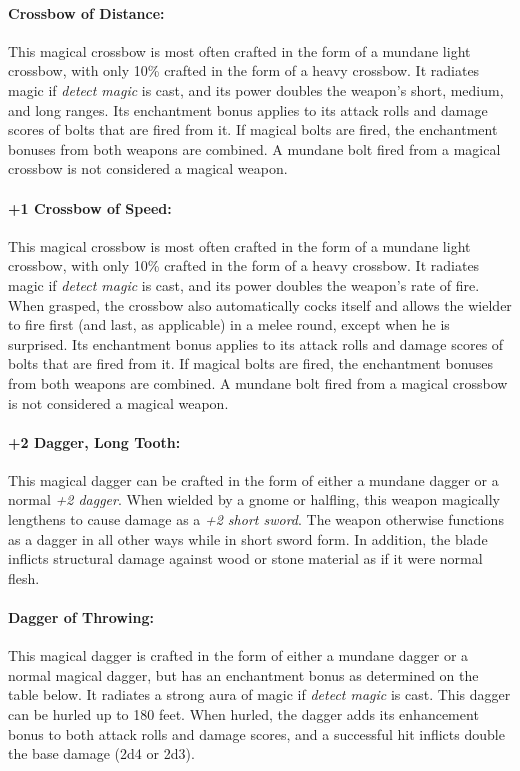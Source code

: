 \begin{multicols}{2}
\paragraph{Crossbow of Distance:} This magical crossbow is most often crafted in the form of a mundane light crossbow, with only 10\% crafted in the form of a heavy crossbow.  It radiates magic if \textit{detect magic} is cast, and its power doubles the weapon's short, medium, and long ranges.  Its enchantment bonus applies to its attack rolls and damage scores of bolts that are fired from it.  If magical bolts are fired, the enchantment bonuses from both weapons are combined.  A mundane bolt fired from a magical crossbow is not considered a magical weapon.

\paragraph{+1 Crossbow of Speed:} This magical crossbow is most often crafted in the form of a mundane light crossbow, with only 10\% crafted in the form of a heavy crossbow.  It radiates magic if \textit{detect magic} is cast, and its power doubles the weapon's rate of fire.    When grasped, the crossbow also automatically cocks itself and allows the wielder to fire first (and last, as applicable) in a melee round, except when he is surprised.  Its enchantment bonus applies to its attack rolls and damage scores of bolts that are fired from it.  If magical bolts are fired, the enchantment bonuses from both weapons are combined.  A mundane bolt fired from a magical crossbow is not considered a magical weapon.

\paragraph{+2 Dagger, Long Tooth:} This magical dagger can be crafted in the form of either a mundane dagger or a normal \textit{+2 dagger}.  When wielded by a gnome or halfling, this weapon magically lengthens to cause damage as a \textit{+2 short sword}.  The weapon otherwise functions as a dagger in all other ways while in short sword form.  In addition, the blade inflicts structural damage against wood or stone material as if it were normal flesh.

\paragraph{Dagger of Throwing:} This magical dagger is crafted in the form of either a mundane dagger or a normal magical dagger, but has an enchantment bonus as determined on the table below.  It radiates a strong aura of magic if \textit{detect magic} is cast.  This dagger can be hurled up to 180 feet.  When hurled, the dagger adds its enhancement bonus to both attack rolls and damage scores, and a successful hit inflicts double the base damage (2d4 or 2d3).
 

\end{multicols}
